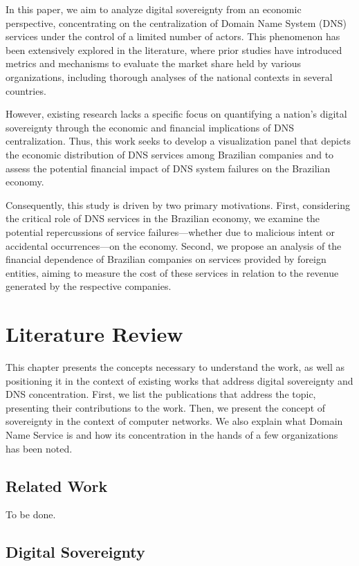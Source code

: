 \documentclass[12pt]{article}
\begin{document}
In this paper, we aim to analyze digital sovereignty from an economic perspective, concentrating on the centralization of Domain Name System (DNS) services under the control of a limited number of actors. This phenomenon has been extensively explored in the literature, where prior studies have introduced metrics and mechanisms to evaluate the market share held by various organizations, including thorough analyses of the national contexts in several countries. 

However, existing research lacks a specific focus on quantifying a nation's digital sovereignty through the economic and financial implications of DNS centralization. Thus, this work seeks to develop a visualization panel that depicts the economic distribution of DNS services among Brazilian companies and to assess the potential financial impact of DNS system failures on the Brazilian economy. 

Consequently, this study is driven by two primary motivations. First, considering the critical role of DNS services in the Brazilian economy, we examine the potential repercussions of service failures—whether due to malicious intent or accidental occurrences—on the economy. Second, we propose an analysis of the financial dependence of Brazilian companies on services provided by foreign entities, aiming to measure the cost of these services in relation to the revenue generated by the respective companies.



\section{Literature Review}

This chapter presents the concepts necessary to understand the work, as well as positioning it in the context of existing works that address digital sovereignty and DNS concentration. First, we list the publications that address the topic, presenting their contributions to the work. Then, we present the concept of sovereignty in the context of computer networks. We also explain what Domain Name Service is and how its concentration in the hands of a few organizations has been noted.

\subsection{Related Work}

To be done.

\subsection{Digital Sovereignty}
\end{document}
